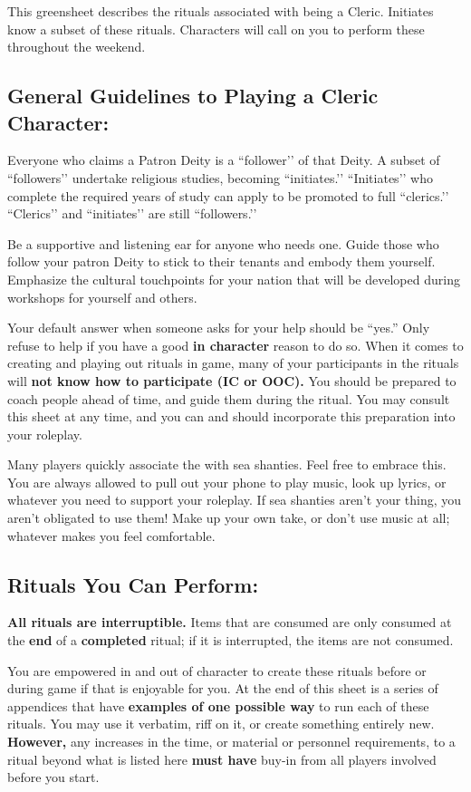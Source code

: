 \documentclass[green]{GL2020}
\begin{document}
\name{\gWRCleric{}}

This greensheet describes the rituals associated with being a Cleric. Initiates know a subset of these rituals. Characters will call on you to perform these throughout the weekend. 

\subsection*{General Guidelines to Playing a Cleric Character:}
Everyone who claims a Patron Deity is a ``follower’’ of that Deity. A subset of ``followers’’ undertake religious studies, becoming ``initiates.’’ ``Initiates’’ who complete the required years of study can apply to be promoted to full ``clerics.’’ ``Clerics’’ and ``initiates’’ are still ``followers.’’

Be a supportive and listening ear for anyone who needs one. Guide those who follow your patron Deity to stick to their tenants and embody them yourself. Emphasize the cultural touchpoints for your nation that will be developed during workshops for yourself and others.

Your default answer when someone asks for your help should be ``yes.'' Only refuse to help if you have a good \textbf{in character} reason to do so. When it comes to creating and playing out rituals in game, many of your participants in the rituals will \textbf{not know how to participate (IC or OOC).} You should be prepared to coach people ahead of time, and guide them during the ritual. You may consult this sheet at any time, and you can and should incorporate this preparation into your roleplay.

Many players quickly associate the \pShip{} with sea shanties. Feel free to embrace this. You are always allowed to pull out your phone to play music, look up lyrics, or whatever you need to support your roleplay. If sea shanties aren’t your thing, you aren’t obligated to use them! Make up your own take, or don’t use music at all; whatever makes you feel comfortable.

\subsection*{Rituals You Can Perform:}
\textbf{All rituals are interruptible.} Items that are consumed are only consumed at the \textbf{end} of a \textbf{completed} ritual; if it is interrupted, the items are not consumed.

You are empowered in and out of character to create these rituals before or during game if that is enjoyable for you. At the end of this sheet is a series of appendices that have \textbf{examples of one possible way} to run each of these rituals. You may use it verbatim, riff on it, or create something entirely new. \textbf{However,} any increases in the time, or material or personnel requirements, to a ritual beyond what is listed here \textbf{must have} buy-in from all players involved before you start.
\end{document}
